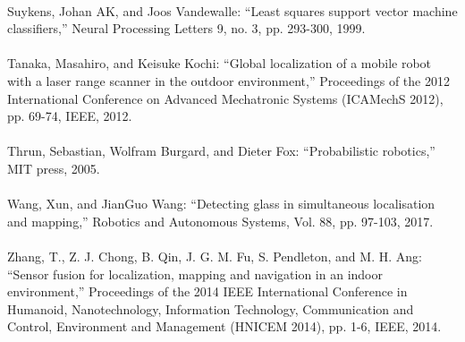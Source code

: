 \begin{mythebibliography}{}
\leavevmode \\
Suykens, Johan AK, and Joos Vandewalle:
\newblock ``Least squares support vector machine classifiers,''
\newblock Neural Processing Letters 9, no. 3, pp. 293-300, 1999.
\\ 

\leavevmode \\
Tanaka, Masahiro, and Keisuke Kochi:
\newblock ``Global localization of a mobile robot with a laser range scanner in the outdoor environment,''
\newblock Proceedings of the 2012 International Conference on Advanced Mechatronic Systems (ICAMechS 2012), pp. 69-74, IEEE, 2012.
\\ 

\leavevmode \\
Thrun, Sebastian, Wolfram Burgard, and Dieter Fox:
\newblock ``Probabilistic robotics,''
\newblock MIT press, 2005.
\\ 

\leavevmode \\
Wang, Xun, and JianGuo Wang:
\newblock ``Detecting glass in simultaneous localisation and mapping,''
\newblock Robotics and Autonomous Systems, Vol. 88, pp. 97-103, 2017.
\\ 

\leavevmode \\
Zhang, T., Z. J. Chong, B. Qin, J. G. M. Fu, S. Pendleton, and M. H. Ang:
\newblock ``Sensor fusion for localization, mapping and navigation in an indoor environment,''
\newblock Proceedings of the 2014 IEEE International Conference in Humanoid, Nanotechnology, Information Technology, Communication and Control, Environment and Management (HNICEM 2014), pp. 1-6, IEEE, 2014.
\\ 

% 
% 

\end{mythebibliography}

